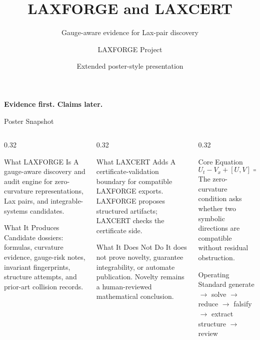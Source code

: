 \documentclass[aspectratio=169,11pt]{beamer}
\title[LAXFORGE + LAXCERT]{LAXFORGE and LAXCERT}
\subtitle{Gauge-aware evidence for Lax-pair discovery}
\author{LAXFORGE Project}
\date{Extended poster-style presentation}
\newcommand{\EvidenceRule}{\textbf{Evidence first. Claims later.}}
\newcommand{\ZCR}{\ensuremath{U_t - V_x + [U,V] = 0}}
\newcommand{\Pipeline}{generate $\rightarrow$ solve $\rightarrow$ reduce $\rightarrow$ falsify $\rightarrow$ extract structure $\rightarrow$ review}
\begin{document}
\begin{frame}[plain]
  \titlepage
  \vspace{-0.6cm}
  \begin{center}
    \Large \EvidenceRule
  \end{center}
\end{frame}

\begin{frame}{Poster Snapshot}
  \begin{columns}[T,totalwidth=\textwidth]
    \begin{column}{0.32\textwidth}
      \begin{block}{What LAXFORGE Is}
        A gauge-aware discovery and audit engine for zero-curvature
        representations, Lax pairs, and integrable-systems candidates.
      \end{block}
      \begin{block}{What It Produces}
        Candidate dossiers: formulas, curvature evidence, gauge-risk notes,
        invariant fingerprints, structure attempts, and prior-art collision
        records.
      \end{block}
    \end{column}
    \begin{column}{0.32\textwidth}
      \begin{block}{What LAXCERT Adds}
        A certificate-validation boundary for compatible LAXFORGE exports.
        LAXFORGE proposes structured artifacts; LAXCERT checks the certificate
        side.
      \end{block}
      \begin{block}{What It Does Not Do}
        It does not prove novelty, guarantee integrability, or automate
        publication. Novelty remains a human-reviewed mathematical conclusion.
      \end{block}
    \end{column}
    \begin{column}{0.32\textwidth}
      \begin{block}{Core Equation}
        \[
          \ZCR
        \]
        The zero-curvature condition asks whether two symbolic directions are
        compatible without residual obstruction.
      \end{block}
      \begin{block}{Operating Standard}
        \centering
        \Pipeline
      \end{block}
    \end{column}
  \end{columns}
\end{frame}
\end{document}
